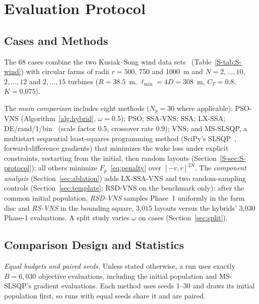 \section{Evaluation Protocol}
\label{sec:setup}

\subsection{Cases and Methods}
The 68 cases combine the two Kusiak--Song wind data sets~\cite{Kusiak2010,Bansal2017} (Table~\ref{S-tab:S-wind}) with circular farms of radii $r=500$, 750 and 1000~m and $N=2,\ldots,10$, $2,\ldots,12$ and $2,\ldots,15$ turbines ($R=38.5$~m, $\ell_{\min}=4D=308$~m, $C_T=0.8$, $K=0.075$).

The \emph{main comparison} includes eight methods ($N_p=30$ where applicable): PSO-VNS (Algorithm~\ref{alg:hybrid}, $\omega=0.5$); PSO; SSA-VNS; SSA; LX-SSA; DE/rand/1/bin~\cite{Storn1997} (scale factor 0.5, crossover rate 0.9); VNS; and MS-SLSQP, a multistart sequential least-squares programming method (SciPy's SLSQP~\cite{Kraft1988}, forward-difference gradients) that minimizes the wake loss under explicit constraints, restarting from the initial, then random layouts (Section~\ref{S-sec:S-protocol}); all others minimize $F_p$~\eqref{eq:penalty} over $[-r,r]^{2N}$. The \emph{component analysis} (Section~\ref{sec:ablation}) adds LX-SSA-VNS and two random-sampling controls (Section~\ref{sec:template}; RSD-VNS on the benchmark only): after the common initial population, \emph{RSD-VNS} samples Phase~1 uniformly in the farm disc and \emph{RS-VNS} in the bounding square, 3,015 layouts versus the hybrids' 3,030 Phase-1 evaluations. A split study varies $\omega$ on \NSplitCases{} cases (Section~\ref{sec:split}).

\subsection{Comparison Design and Statistics}
\emph{Equal budgets and paired seeds.} Unless stated otherwise, a run uses exactly $B=6{,}030$ objective evaluations, including the initial population and MS-SLSQP's gradient evaluations. Each method uses seeds 1--30 and draws its initial population first, so runs with equal seeds share it and are paired.

